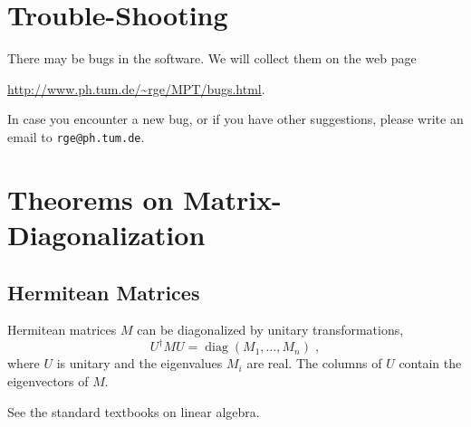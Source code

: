 \documentclass[12pt,a4paper,twoside]{scrartcl}
\newcommand{\function}[1]{{\tt #1}}
\DeclareMathOperator{\diag}{diag}
\numberwithin{equation}{section}
\numberwithin{table}{section}
\begin{document}
% 
% 

\section{Trouble-Shooting}

There may be bugs in the software. We will collect them on the web page 
\begin{center}
\url{http://www.ph.tum.de/~rge/MPT/bugs.html}\;. 
\end{center}
In case you encounter a new bug, or if you have other
suggestions, please write an email to \texttt{rge@ph.tum.de}.

\clearpage
\appendix
\section{Theorems on Matrix-Diagonalization}
\subsection*{Hermitean Matrices}
\begin{Theorem}
 Hermitean matrices $M$ can be diagonalized by unitary transformations,
 \begin{equation}
        U^\dagger M U = \diag(M_1,\dots,M_n) \;,
 \end{equation}
 where $U$ is unitary and the eigenvalues $M_i$ are real. The columns of
 $U$ contain the eigenvectors of $M$.
\end{Theorem}
\begin{Proof}
 See the standard textbooks on linear algebra.
\end{Proof}
\end{document}
